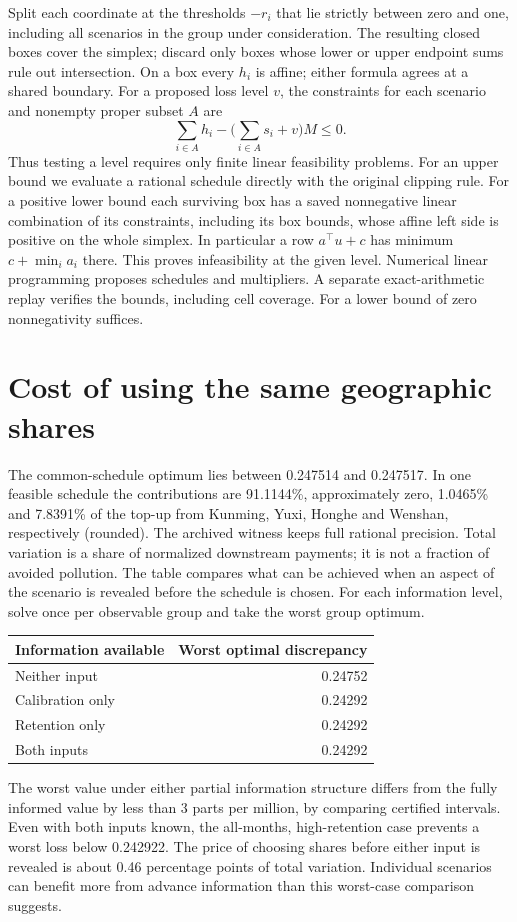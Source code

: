 \documentclass[11pt]{article}
\begin{document}
Split each coordinate at the thresholds $-r_i$ that lie strictly between zero and one, including all scenarios in the group under consideration. The resulting closed boxes cover the simplex; discard only boxes whose lower or upper endpoint sums rule out intersection. On a box every $h_i$ is affine; either formula agrees at a shared boundary. For a proposed loss level $v$, the constraints for each scenario and nonempty proper subset $A$ are
\[
 \sum_{i\in A} h_i-\bigl(\sum_{i\in A}s_i+v\bigr)M\le0.
\]
Thus testing a level requires only finite linear feasibility problems. For an upper bound we evaluate a rational schedule directly with the original clipping rule. For a positive lower bound each surviving box has a saved nonnegative linear combination of its constraints, including its box bounds, whose affine left side is positive on the whole simplex. In particular a row $a^\top u+c$ has minimum $c+\min_i a_i$ there. This proves infeasibility at the given level. Numerical linear programming proposes schedules and multipliers. A separate exact-arithmetic replay verifies the bounds, including cell coverage. For a lower bound of zero nonnegativity suffices.

\section{Cost of using the same geographic shares}
The common-schedule optimum lies between 0.247514 and 0.247517. In one feasible schedule the contributions are 91.1144\%, approximately zero, 1.0465\% and 7.8391\% of the top-up from Kunming, Yuxi, Honghe and Wenshan, respectively (rounded). The archived witness keeps full rational precision. Total variation is a share of normalized downstream payments; it is not a fraction of avoided pollution. The table compares what can be achieved when an aspect of the scenario is revealed before the schedule is chosen. For each information level, solve once per observable group and take the worst group optimum.
\begin{center}
\begin{tabular}{lr}\toprule Information available & Worst optimal discrepancy\\\midrule
Neither input & 0.24752\\
Calibration only & 0.24292\\
Retention only & 0.24292\\
Both inputs & 0.24292\\
\bottomrule\end{tabular}
\end{center}
The worst value under either partial information structure differs from the fully informed value by less than $3$ parts per million, by comparing certified intervals. Even with both inputs known, the all-months, high-retention case prevents a worst loss below 0.242922. The price of choosing shares before either input is revealed is about 0.46 percentage points of total variation. Individual scenarios can benefit more from advance information than this worst-case comparison suggests.
\end{document}
